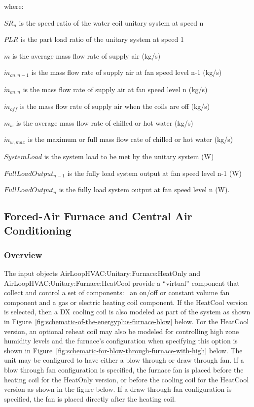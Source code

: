 where:

$SR_n$ is the speed ratio of the water coil unitary system at speed n

$PLR$ is the part load ratio of the unitary system at speed 1

$\dot{m}$ is the average mass flow rate of supply air (kg/s)

$\dot{m}_{on, n-1}$ is the mass flow rate of supply air at fan speed level n-1 (kg/s)

$\dot{m}_{on, n}$ is the mass flow rate of supply air at fan speed level n (kg/s)

$\dot{m}_{off}$ is the mass flow rate of supply air when the coils are off (kg/s)

$\dot{m}_{w}$ is the average mass flow rate of chilled or hot water (kg/s)

$\dot{m}_{w, max}$ is the maximum or full mass flow rate of chilled or hot water (kg/s)

$SystemLoad$ is the system load to be met by the unitary system (W)

$FullLoadOutput_{n-1}$ is the fully load system output at fan speed level n-1 (W)

$FullLoadOutput_{n}$ is the fully load system output at fan speed level n (W).

\subsection{Forced-Air Furnace and Central Air Conditioning}\label{forced-air-furnace-and-central-air-conditioning}

\subsubsection{Overview}\label{overview-1}

The input objects AirLoopHVAC:Unitary:Furnace:HeatOnly and \\
AirLoopHVAC:Unitary:Furnace:HeatCool provide a ``virtual'' component that collect and control a set of components:~ an on/off or constant volume fan component and a gas or electric heating coil component. If the HeatCool version is selected, then a DX cooling coil is also modeled as part of the system as shown in Figure~\ref{fig:schematic-of-the-energyplus-furnace-blow} below. For the HeatCool version, an optional reheat coil may also be modeled for controlling high zone humidity levels and the furnace's configuration when specifying this option is shown in Figure~\ref{fig:schematic-for-blow-through-furnace-with-high} below. The unit may be configured to have either a blow through or draw through fan. If a blow through fan configuration is specified, the furnace fan is placed before the heating coil for the HeatOnly version, or before the cooling coil for the HeatCool version as shown in the figure below. If a draw through fan configuration is specified, the fan is placed directly after the heating coil.

